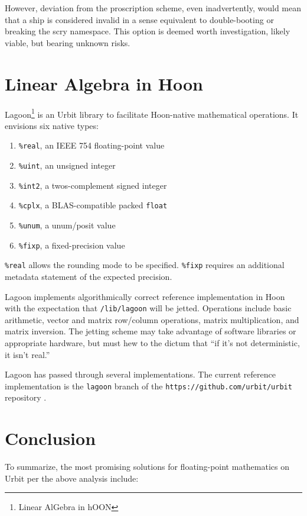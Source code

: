 \documentclass[twoside]{article}
\begin{document}
However, deviation from the proscription scheme, even inadvertently, would mean that a ship is considered invalid in a sense equivalent to double-booting or breaking the scry namespace.  This option is deemed worth investigation, likely viable, but bearing unknown risks.


\section{Linear Algebra in Hoon}

Lagoon\footnote{Linear AlGebra in hOON} is an Urbit library to facilitate Hoon-native mathematical operations.  It envisions six native types:

\begin{enumerate}
  \item  \texttt{\%real}, an IEEE 754 floating-point value
  \item  \texttt{\%uint}, an unsigned integer
  \item  \texttt{\%int2}, a twos-complement signed integer
  \item  \texttt{\%cplx}, a BLAS-compatible packed \texttt{float}
  \item  \texttt{\%unum}, a unum/posit value
  \item  \texttt{\%fixp}, a fixed-precision value
\end{enumerate}

\texttt{\%real} allows the rounding mode to be specified.  \texttt{\%fixp} requires an additional metadata statement of the expected precision.

Lagoon implements algorithmically correct reference implementation in Hoon with the expectation that \texttt{/lib/lagoon} will be jetted.  Operations include basic arithmetic, vector and matrix row/column operations, matrix multiplication, and matrix inversion.  The jetting scheme may take advantage of software libraries or appropriate hardware, but must hew to the dictum that “if it's not deterministic, it isn't real.”

Lagoon has passed through several implementations.  The current reference implementation is the \texttt{lagoon} branch of the \texttt{https://github.com/urbit/urbit} repository \citep{Urbit}.


\section{Conclusion}

To summarize, the most promising solutions for floating-point mathematics on Urbit per the above analysis include:
\end{document}
